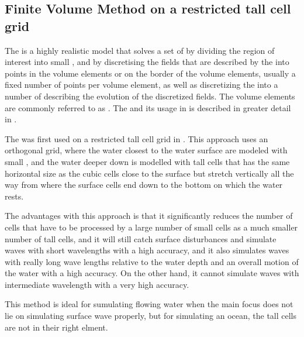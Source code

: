 

\subsection{Finite Volume Method on a restricted tall cell grid}

The \FVM is a highly realistic model that solves a set of \PDEs by dividing the region of interest into small , and by discretising the fields that are described by the \PDEs into points in the volume elements or on the border of the volume elements, usually a fixed number of points per volume element, as well as discretizing the \PDEs into a number of \ODEs describing the evolution of the discretized fields. The volume elements are commonly referred to as \cells. The \FVM and its usage in \CFD is described in greater detail in .

The \FVM was first used on a restricted tall cell grid in \citep{Chentanez2011}. This approach uses an orthogonal grid, where the water closest to the water surface are modeled with small , and the water deeper down is modelled with tall cells that has the same horizontal size as the cubic cells close to the surface but stretch vertically all the way from where the surface cells end down to the bottom on which the water rests.

The advantages with this approach is that it significantly reduces the number of cells that have to be processed by \approximating a large number of small cells as a much smaller number of tall cells, and it will still catch surface disturbances and simulate waves with short wavelengths with a high accuracy, and it also simulates waves with really long wave lengths relative to the water depth and an overall motion of the water with a high accuracy. On the other hand, it cannot simulate waves with intermediate wavelength with a very high accuracy.

This method is ideal for sumulating flowing water when the main focus does not lie on simulating surface wave properly, but for simulating an ocean, the tall cells are not in their right elment.

